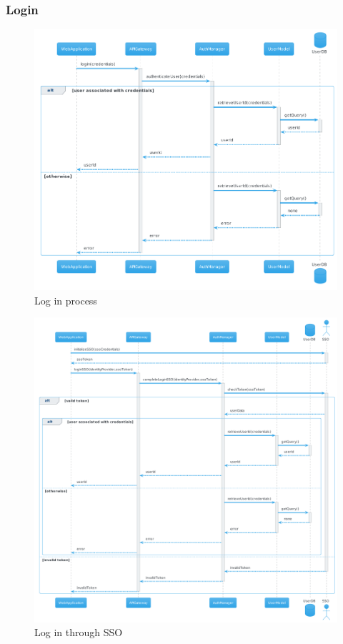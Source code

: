\subsubsection{Login}
\begin{figure}[H]
    \centering
    \includegraphics[width=1\textwidth]{Diagrams/sequence/login.png}
    \caption{Log in process}
\end{figure}
\begin{figure}[H]
    \hspace{-0.7cm}
    \includegraphics[width=1.1\textwidth]{Diagrams/sequence/login_SSO.png}
    \caption{Log in through SSO}
\end{figure}

